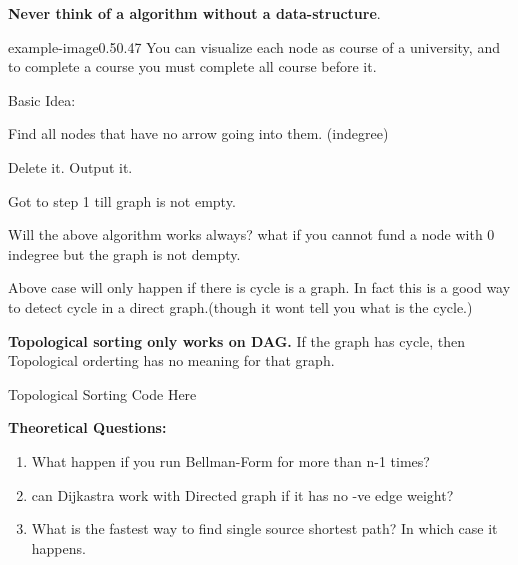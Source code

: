 \begin{marginfigure}
    \vspace{2mm}
    
    \raggedright
    \textbf{
        Never think of a algorithm without a data-structure}.
\end{marginfigure}

\vspace{5cm}
\begin{lfigure}{example-image}{0.5}{0.47}
    You can visualize each node as course of a university, and to complete a course you must complete all course before it.

    Basic Idea:
    \begin{compactenum}
        \item Find all nodes that have no arrow going into them. (indegree)
        \item Delete it. Output it.
        \item Got to step 1 till graph is not empty.
    \end{compactenum}
\end{lfigure}

Will the above algorithm works always? what if you cannot fund a node with 0 indegree but the graph is not dempty.

Above case will only happen if there is cycle is a graph. In fact this is a good way to detect cycle in a direct graph.(though it wont tell you what is the cycle.)

\textbf{Topological sorting only works on DAG.} If the graph has cycle, then Topological orderting has no meaning for that graph.

\medskip
\begin{code3}
    Topological Sorting Code Here
\end{code3}





\begin{exercise}
    \textbf{Theoretical Questions:}
    \begin{enumerate}
        \item What happen if you run Bellman-Form for more than n-1 times?
        \item can Dijkastra work with Directed graph if it has no -ve edge weight?
        \item What is the fastest way to find single source shortest path? In which case it happens.
    \end{enumerate}
\end{exercise}

